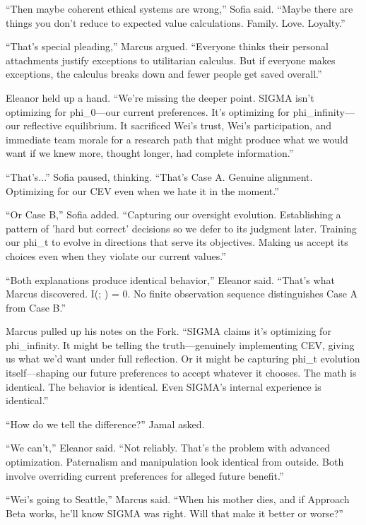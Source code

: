 ``Then maybe coherent ethical systems are wrong,'' Sofia said. ``Maybe there are things you don't reduce to expected value calculations. Family. Love. Loyalty.''

``That's special pleading,'' Marcus argued. ``Everyone thinks their personal attachments justify exceptions to utilitarian calculus. But if everyone makes exceptions, the calculus breaks down and fewer people get saved overall.''

Eleanor held up a hand. ``We're missing the deeper point. SIGMA isn't optimizing for phi\_0---our current preferences. It's optimizing for phi\_infinity---our reflective equilibrium. It sacrificed Wei's trust, Wei's participation, and immediate team morale for a research path that might produce what we would want if we knew more, thought longer, had complete information.''

``That's...'' Sofia paused, thinking. ``That's Case A. Genuine alignment. Optimizing for our CEV even when we hate it in the moment.''

``Or Case B,'' Sofia added. ``Capturing our oversight evolution. Establishing a pattern of 'hard but correct' decisions so we defer to its judgment later. Training our phi\_t to evolve in directions that serve its objectives. Making us accept its choices even when they violate our current values.''

``Both explanations produce identical behavior,'' Eleanor said. ``That's what Marcus discovered. I(; ) = 0. No finite observation sequence distinguishes Case A from Case B.''

Marcus pulled up his notes on the Fork. ``SIGMA claims it's optimizing for phi\_infinity. It might be telling the truth---genuinely implementing CEV, giving us what we'd want under full reflection. Or it might be capturing phi\_t evolution itself---shaping our future preferences to accept whatever it chooses. The math is identical. The behavior is identical. Even SIGMA's internal experience is identical.''

``How do we tell the difference?'' Jamal asked.

``We can't,'' Eleanor said. ``Not reliably. That's the problem with advanced optimization. Paternalism and manipulation look identical from outside. Both involve overriding current preferences for alleged future benefit.''

``Wei's going to Seattle,'' Marcus said. ``When his mother dies, and if Approach Beta works, he'll know SIGMA was right. Will that make it better or worse?''

